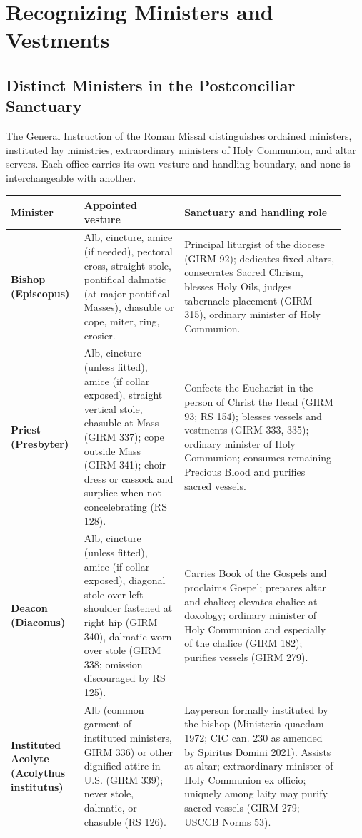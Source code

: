 \clearpage
\section{Recognizing Ministers and Vestments}
\subsection*{Distinct Ministers in the Postconciliar Sanctuary}
The General Instruction of the Roman Missal distinguishes ordained ministers, instituted lay ministries, extraordinary ministers of Holy Communion, and altar servers. Each office carries its own vesture and handling boundary, and none is interchangeable with another.

{\footnotesize\begin{longtable}{>{\raggedright\arraybackslash}p{0.20\linewidth}>{\raggedright\arraybackslash}p{0.28\linewidth}>{\raggedright\arraybackslash}p{0.45\linewidth}}
\toprule
\textbf{Minister} & \textbf{Appointed vesture} & \textbf{Sanctuary and handling role} \\
\midrule
\endhead
\textbf{Bishop (Episcopus)} & Alb, cincture, amice (if needed), pectoral cross, straight stole, pontifical dalmatic (at major pontifical Masses), chasuble or cope, miter, ring, crosier. & Principal liturgist of the diocese (GIRM 92); dedicates fixed altars, consecrates Sacred Chrism, blesses Holy Oils, judges tabernacle placement (GIRM 315), ordinary minister of Holy Communion. \\
\textbf{Priest (Presbyter)} & Alb, cincture (unless fitted), amice (if collar exposed), straight vertical stole, chasuble at Mass (GIRM 337); cope outside Mass (GIRM 341); choir dress or cassock and surplice when not concelebrating (RS 128). & Confects the Eucharist in the person of Christ the Head (GIRM 93; RS 154); blesses vessels and vestments (GIRM 333, 335); ordinary minister of Holy Communion; consumes remaining Precious Blood and purifies sacred vessels. \\
\textbf{Deacon (Diaconus)} & Alb, cincture (unless fitted), amice (if collar exposed), diagonal stole over left shoulder fastened at right hip (GIRM 340), dalmatic worn over stole (GIRM 338; omission discouraged by RS 125). & Carries Book of the Gospels and proclaims Gospel; prepares altar and chalice; elevates chalice at doxology; ordinary minister of Holy Communion and especially of the chalice (GIRM 182); purifies vessels (GIRM 279). \\
\textbf{Instituted Acolyte (Acolythus institutus)} & Alb (common garment of instituted ministers, GIRM 336) or other dignified attire in U.S. (GIRM 339); never stole, dalmatic, or chasuble (RS 126). & Layperson formally instituted by the bishop (Ministeria quaedam 1972; CIC can. 230 as amended by Spiritus Domini 2021). Assists at altar; extraordinary minister of Holy Communion ex officio; uniquely among laity may purify sacred vessels (GIRM 279; USCCB Norms 53). \\

\end{longtable}}
